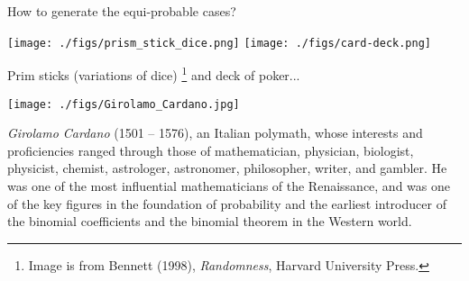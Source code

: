 \documentclass[9pt]{beamer}
\begin{document}
\begin{frame}[fragile] %
 \begin{center}
   How to generate the equi-probable cases?
 \end{center}
 \vfill \pause
 \begin{center}
   \texttt{[image: ./figs/prism\_stick\_dice.png]}
   \texttt{[image: ./figs/card-deck.png]}
   \bigskip

   Prim sticks (variations of dice) \footnote{Image is from Bennett (1998), {\it Randomness},
   Harvard University Press.} and deck of poker...
 \end{center}
\end{frame}
\begin{frame}[fragile] %
 \begin{center}
   \texttt{[image: ./figs/Girolamo\_Cardano.jpg]}
   \bigskip

   {\it Girolamo Cardano} (1501 -- 1576),  an Italian polymath, whose interests and proficiencies ranged
   through those of mathematician, physician, biologist, physicist, chemist, astrologer, astronomer,
   philosopher, writer, and gambler. He was one of the most influential mathematicians of the
   Renaissance, and was one of the key figures in the foundation of probability and the earliest
   introducer of the binomial coefficients and the binomial theorem in the Western world.
 \end{center}
\end{frame}
\end{document}
